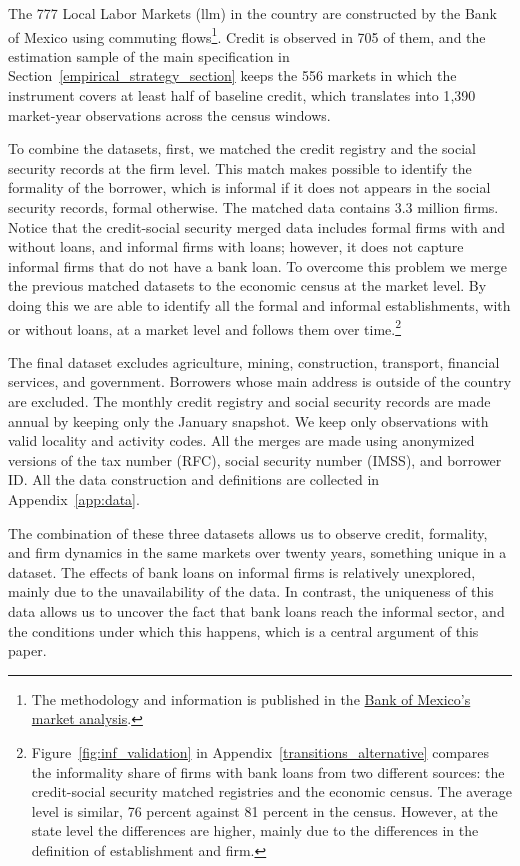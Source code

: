 \documentclass[12pt]{article}
\begin{document}
The 777 Local Labor Markets (llm) in the country are constructed by the Bank of Mexico using commuting flows\footnote{The methodology and information is published in the \href{https://www.banxico.org.mx/DataSetsWeb/dataset?ruta=LLM&idioma=en}{Bank of Mexico's market analysis}.}. Credit is observed in 705 of them, and the estimation sample of the main specification in Section~\ref{empirical_strategy_section} keeps the 556 markets in which the instrument covers at least half of baseline credit, which translates into 1{,}390 market-year observations across the census windows. 

To combine the datasets, first, we matched the credit registry and the social security records at the firm level. This match makes possible to identify the formality of the borrower, which is informal if it does not appears in the social security records, formal otherwise. The matched data contains 3.3 million firms. Notice that the credit-social security merged data includes formal firms with and without loans, and informal firms with loans; however, it does not capture informal firms that do not have a bank loan. To overcome this problem we merge the previous matched datasets to the economic census at the market level. By doing this we are able to identify all the formal and informal establishments, with or without loans, at a market level and follows them over time.\footnote{Figure~\ref{fig:inf_validation} in Appendix~\ref{transitions_alternative} compares the informality share of firms with bank loans from two different sources: the credit-social security matched registries and the economic census. The average level is similar, 76 percent against  81 percent in the census. However, at the state level the differences are higher, mainly due to the differences in the definition of establishment and firm.} 

The final dataset excludes agriculture, mining, construction, transport, financial services, and government. Borrowers whose main address is outside of the country are excluded. The monthly credit registry and social security records are made annual by keeping only the January snapshot. We keep only observations with valid locality and activity codes. All the merges are made using anonymized versions of the tax number (RFC), social security number (IMSS), and borrower ID. All the data construction and definitions are collected in Appendix~\ref{app:data}.

The combination of these three datasets allows us to observe credit, formality, and firm dynamics in the same markets over twenty years, something unique in a dataset. The effects of bank loans on informal firms is relatively unexplored, mainly due to the unavailability of the data. In contrast, the uniqueness of this data allows us to uncover the fact that bank loans reach the informal sector, and the conditions under which this happens, which is a central argument of this paper. 
\end{document}
